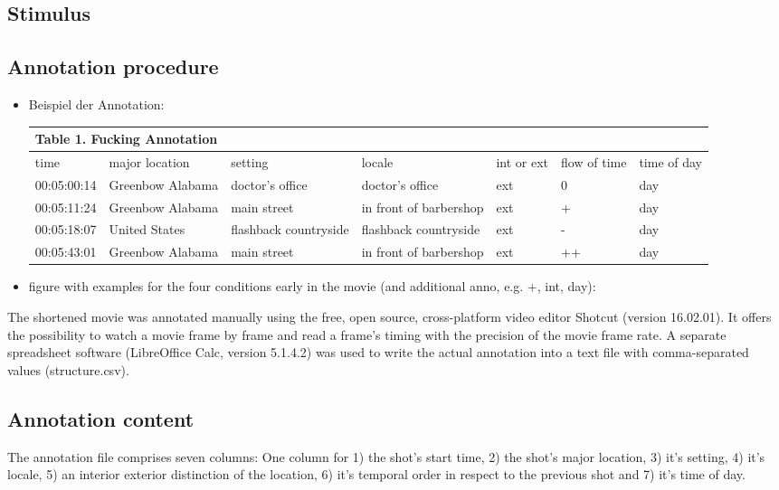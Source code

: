 \documentclass[10pt,a4paper,twocolumn]{article}
\begin{document}
\subsection*{Stimulus}

\subsection*{Annotation procedure}
\begin{itemize}
\item Beispiel der Annotation: 
\begin{table}[h]
\begin{tabular}{lllllll}
\multicolumn{7}{l}{Table 1. Fucking Annotation}\tabularnewline
\hline 
time & major location & setting & locale & int or ext & flow of time & time of day\tabularnewline
00:05:00:14  & Greenbow Alabama  & doctor's office  & doctor's office  & ext  & 0 & day\tabularnewline
00:05:11:24  & Greenbow Alabama  & main street  & in front of barbershop  & ext  & + & day\tabularnewline
00:05:18:07  & United States  & flashback countryside  & flashback countryside  & ext  & - & day\tabularnewline
00:05:43:01 & Greenbow Alabama  & main street  & in front of barbershop  & ext  & ++ & day\tabularnewline
\hline 
\end{tabular}
\end{table}

\item figure with examples for the four conditions early in the movie (and
additional anno, e.g. +, int, day):
\end{itemize}
The shortened movie was annotated manually using the free, open source,
cross-platform video editor Shotcut (version 16.02.01). It offers
the possibility to watch a movie frame by frame and read a frame's timing
with the precision of the movie frame rate. A separate spreadsheet
software (LibreOffice Calc, version 5.1.4.2) was used to write the
actual annotation into a text file with comma-separated values (structure.csv). 

\subsection*{Annotation content}

The annotation file comprises seven columns: One column for 1) the
shot's start time, 2) the shot's major location, 3) it's setting,
4) it's locale, 5) an interior exterior distinction of the location,
6) it's temporal order in respect to the previous shot and 7) it's
time of day. 
\end{document}
